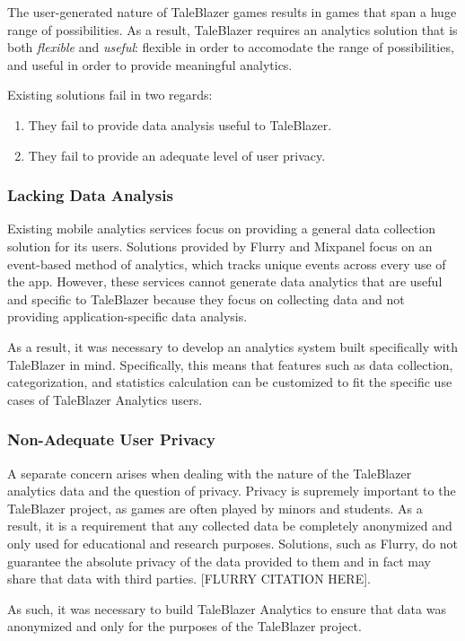 The user-generated nature of TaleBlazer games results in games that span a huge range of possibilities. As a result, TaleBlazer requires an analytics solution that is both \textit{flexible} and \textit{useful}: flexible in order to accomodate the range of possibilities, and useful in order to provide meaningful analytics.

Existing solutions fail in two regards:
\begin{enumerate}
	\item They fail to provide data analysis useful to TaleBlazer.
	\item They fail to provide an adequate level of user privacy.
\end{enumerate}

\subsubsection{Lacking Data Analysis}

Existing mobile analytics services focus on providing a general data collection solution for its users. Solutions provided by Flurry and Mixpanel focus on an event-based method of analytics, which tracks unique events across every use of the app. However, these services cannot generate data analytics that are useful and specific to TaleBlazer because they focus on collecting data and not providing application-specific data analysis.

As a result, it was necessary to develop an analytics system built specifically with TaleBlazer in mind. Specifically, this means that features such as data collection, categorization, and statistics calculation can be customized to fit the specific use cases of TaleBlazer Analytics users. 

\subsubsection{Non-Adequate User Privacy}

A separate concern arises when dealing with the nature of the TaleBlazer analytics data and the question of privacy. Privacy is supremely important to the TaleBlazer project, as games are often played by minors and students. As a result, it is a requirement that any collected data be completely anonymized and only used for educational and research purposes. Solutions, such as Flurry, do not guarantee the absolute privacy of the data provided to them and in fact may share that data with third parties. [FLURRY CITATION HERE].

As such, it was necessary to build TaleBlazer Analytics to ensure that data was anonymized and only for the purposes of the TaleBlazer project. 





















